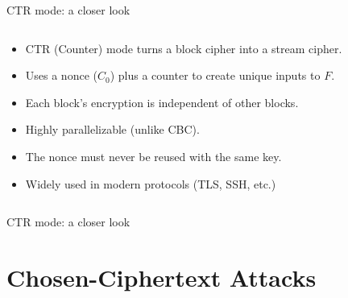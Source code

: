 \documentclass[aspectratio=169, lualatex, handout]{beamer}
\begin{document}
\begin{frame}{CTR mode: a closer look}
	\begin{columns}[c]
		\begin{column}{0.6\textwidth}
			\begin{itemize}
				\item CTR (Counter) mode turns a block cipher into a stream cipher.
				\item Uses a nonce ($C_0$) plus a counter to create unique inputs to $F$.
				\item Each block's encryption is independent of other blocks.
				\item Highly parallelizable (unlike CBC).
				\item The nonce must never be reused with the same key.
				\item Widely used in modern protocols (TLS, SSH, etc.)
			\end{itemize}
		\end{column}
		\begin{column}{0.4\textwidth}
		\end{column}
	\end{columns}
\end{frame}

\begin{frame}{CTR mode: a closer look}
\end{frame}

\section{Chosen-Ciphertext Attacks}
\end{document}
